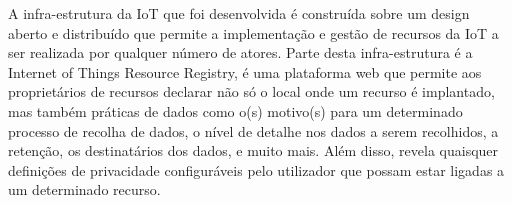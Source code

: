 \documentclass[conference]{IEEEtran}
\begin{document}

A infra-estrutura da IoT que foi desenvolvida \cite{DasPersonalized} é
construída sobre um design aberto e distribuído que permite a implementação
e gestão de recursos da IoT a ser realizada por qualquer número de atores.
Parte desta infra-estrutura é a Internet of Things Resource Registry, é uma
plataforma web que permite aos proprietários de recursos declarar não só o
local onde um recurso é implantado, mas também práticas de dados como o(s)
motivo(s) para um determinado processo de recolha de dados, o nível de
detalhe nos dados a serem recolhidos, a retenção, os destinatários dos
dados, e muito mais. Além disso, revela quaisquer definições de privacidade
configuráveis pelo utilizador que possam estar ligadas a um determinado
recurso.

\end{document}
